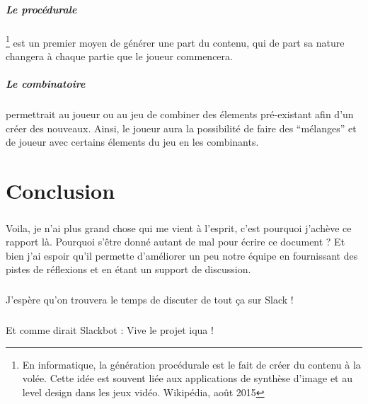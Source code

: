 \documentclass{report}
\begin{document}
\paragraph{Le procédurale}\footnote{\og En informatique, la génération procédurale est le fait de créer du contenu à la volée. Cette idée est souvent liée aux applications de synthèse d'image et au level design dans les jeux vidéo. \fg \hspace{0.5cm} Wikipédia, août 2015}
est un premier moyen de générer une part du contenu, qui de part sa nature changera à chaque partie que le joueur commencera.

\paragraph{Le combinatoire}
 permettrait au joueur ou au jeu de combiner des élements pré-existant afin d'un créer des nouveaux. Ainsi, le joueur aura la possibilité de faire des ``mélanges'' et de joueur avec certains élements du jeu en les combinants.

\chapter{Conclusion}
\paragraph{}
Voila, je n'ai plus grand chose qui me vient à l'esprit, c'est pourquoi j'achève ce rapport là. Pourquoi s'être donné autant de mal pour écrire ce document ? Et bien j'ai espoir qu'il permette d'améliorer un peu notre équipe en fournissant des pistes de réflexions et en étant un support de discussion.

\paragraph{}
J'espère qu'on trouvera le temps de discuter de tout ça sur Slack !

\vspace{3cm}

\begin{center}
\paragraph{}
Et comme dirait Slackbot : Vive le projet iqua !
\end{center}
  
\end{document}
